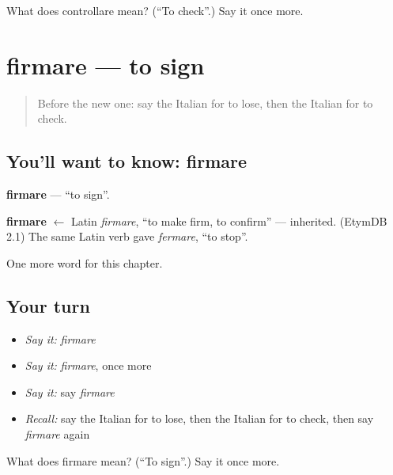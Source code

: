 \begin{tcolorbox}[breakable,colback=teal!4,colframe=teal!35!black,title={Before you move on}]
What does controllare mean? (\textquotedblleft{}To check\textquotedblright{}.) Say it once more.
\end{tcolorbox}
\section[firmare]{firmare — to sign}

\label{lesson:IT-C235-firmare}



\begin{quote}
Before the new one: say the Italian for to lose, then the Italian for to check.
\end{quote}

\subsection*{You'll want to know: firmare}
\textbf{firmare} — \textquotedblleft{}to sign\textquotedblright{}.

\begin{cousinweb}
\textbf{firmare} $\leftarrow$ Latin \emph{firmare}, \textquotedblleft{}to make firm, to confirm\textquotedblright{} — inherited. (EtymDB 2.1) The same Latin verb gave \emph{fermare}, \textquotedblleft{}to stop\textquotedblright{}.
\end{cousinweb}

\begin{grammarlens}[title={What you've built}]
One more word for this chapter.
\end{grammarlens}

\subsection*{Your turn}
\begin{itemize}
\raggedright
  \item \emph{Say it:} \emph{firmare}
  \item \emph{Say it:} \emph{firmare}, once more
  \item \emph{Say it:} say \emph{firmare}
  \item \emph{Recall:} say the Italian for to lose, then the Italian for to check, then say \emph{firmare} again
\end{itemize}

\begin{tcolorbox}[breakable,colback=teal!4,colframe=teal!35!black,title={Before you move on}]
What does firmare mean? (\textquotedblleft{}To sign\textquotedblright{}.) Say it once more.
\end{tcolorbox}

